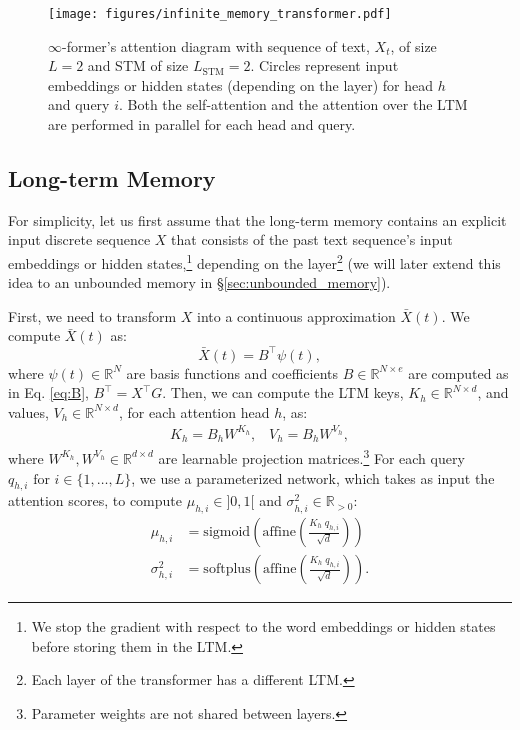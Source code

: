 \documentclass[11pt]{article}
\begin{document}
\begin{figure}[t]
    \centering
    \texttt{[image: figures/infinite\_memory\_transformer.pdf]}
    \caption{\mbox{$\infty$-former's} attention diagram with sequence of text, $X_t$, of size $L=2$ and STM of size $L_\mathrm{STM}=2$. Circles represent input embeddings or hidden states (depending on the layer) for head $h$ and query $i$. Both the self-attention and the attention over the LTM are performed in parallel for each head and query.}
    \label{fig:infinite_transformer}
\end{figure}

\subsection{Long-term Memory}
\label{sec:ltm}

For simplicity, let us first assume that the long-term memory contains an explicit input discrete sequence $X$ that consists of the past text sequence's input embeddings or hidden states,\footnote{We stop the gradient with respect to the word embeddings or hidden states before storing them in the LTM.} depending on the layer\footnote{Each layer of the transformer has a different LTM.} (we will later extend this idea to an unbounded memory in \S\ref{sec:unbounded_memory}).

First, we need to transform $X$ into a continuous approximation $\bar{X}(t)$. 
We compute $\bar{X}(t)$ as:
\begin{equation}
    \bar{X}(t) = B^\top \psi(t), 
\end{equation}
where ${\psi(t) \in \mathbb{R}^N}$ are basis functions and coefficients ${B \in \mathbb{R}^{N\times e}}$ are computed as in Eq. \ref{eq:B},
    $B^\top = X^\top G$.
Then, we can compute the LTM keys, ${K_h \in \mathbb{R}^{N \times d}}$, and values, ${V_h \in \mathbb{R}^{N \times d}}$, for each attention head $h$, as: 
\begin{align}
    K_h = B_h W^{K_h},\;\;\; V_h = B_h W^{V_h},
\end{align}
where ${W^{K_h}, W^{V_h} \in \mathbb{R}^{d\times d}}$  are learnable projection matrices.\footnote{Parameter weights are not shared between layers.}
For each query ${q_{h,i} \text{ for } i \in \{1,\dots,L\}}$, we use a parameterized network, which takes as input the attention scores, to compute ${\mu_{h,i} \in ]0,1[}$
and ${\sigma_{h,i}^2 \in \mathbb{R}_{>0}}$:
\begin{align}\label{eq:mu}
    \mu_{h,i} \!&=\! \mathrm{sigmoid}\left(\mathrm{affine}\left( \frac{K_{h}\; q_{h,i}}{\sqrt{d}}\right)\right)\\\label{eq:sigma}
    \sigma^2_{h,i} \!&=\! \mathrm{softplus}\left(\mathrm{affine}\left( \frac{K_{h}\; q_{h,i}}{\sqrt{d}}\right)\right).
\end{align}
\end{document}
